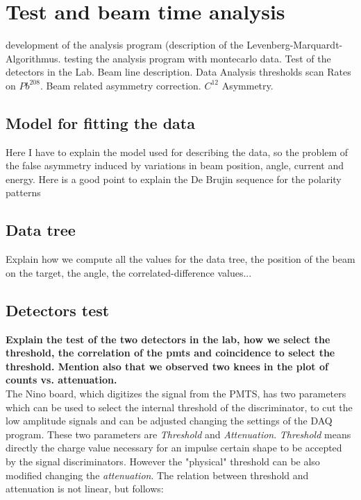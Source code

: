 \chapter{Test and beam time analysis} \label{analysis}

\begin{outline}[enumerate]
\1 development of the analysis program (description of the Levenberg-Marquardt-Algorithmus.
\1 testing the analysis program with montecarlo data.
\1 Test of the detectors in the Lab.
\1 Beam line description.
\1 Data Analysis
	\2 thresholds scan
	\2 Rates on $Pb^{208}$.
	\2 Beam related asymmetry correction.
	\2 $C^{12}$ Asymmetry.
\end{outline}

\section{Model for fitting the data}
Here I have to explain the model used for describing the data, so the problem of the false asymmetry induced by variations in beam position, angle, current and energy. Here is a good point to explain the De Brujin sequence for the polarity patterns

\section{Data tree}
Explain how we compute all the values for the data tree, the position of the beam on the target, the angle, the correlated-difference values...

\section{Detectors test}

{\bfseries Explain the test of the two detectors in the lab, how we select the threshold, the correlation of the pmts and coincidence to select the threshold. Mention also that we observed two knees in the plot of counts vs. attenuation.}\\

The Nino board, which digitizes the signal from the PMTS, has two parameters which can be used to select the internal threshold of the discriminator, to cut the low amplitude signals and can be adjusted changing the settings of the DAQ program. These two parameters are \textit{Threshold} and \textit{Attenuation}. \textit{Threshold} means directly the charge value necessary for an impulse certain shape to be accepted by the signal discriminators. However the "physical" threshold can be also modified changing the \textit{attenuation}. The relation between threshold and attenuation is not linear, but follows:

